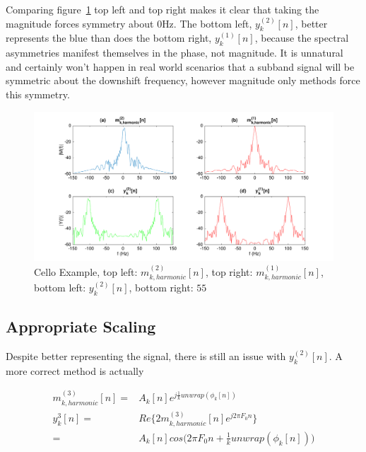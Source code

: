 \documentclass [11pt, proquest,oneside] {ganter_thesis}[2015/03/03]
\begin{document}
Comparing figure~\ref{fig:real_vs_magnitude_example} top left and top right makes it clear that taking the magnitude forces symmetry about $0$Hz.  The bottom left, $y_k^{(2)}[n]$, better represents the blue than does the bottom right, $y_k^{(1)}[n]$, because the spectral asymmetries manifest themselves in the phase, not magnitude.  It is unnatural and certainly won't happen in real world scenarios that a subband signal will be symmetric about the downshift frequency, however magnitude only methods force this symmetry.

\begin{figure}[!ht]
  \centering
    \includegraphics[width=1\textwidth]{matlab/real_vs_magnitude_example}   
    \caption{Cello Example, top left: $m^{(2)}_{k,harmonic}[n]$, top right: $m^{(1)}_{k,harmonic}[n]$, bottom left: $y^{(2)}_k[n]$, bottom right: $55$}\label{fig:real_vs_magnitude_example}
\end{figure}


\subsection{Appropriate Scaling}

Despite better representing the signal, there is still an issue with $y_k^{(2)}[n]$.  A more correct method is actually

\begin{align}
\label{eq:realVSmag3}
m^{(3)}_{k,harmonic}[n] =& A_k[n]e^{j\frac{1}{k} unwrap(\phi_k[n])} \\
y_k^3[n] =& Re\{ 2 m^{(3)}_{k,harmonic}[n] e^{j2\pi F_0 n} \}  \\
=& A_k[n]cos\Big(2\pi F_0 n + \frac{1}{k}unwrap(\phi_k[n])\Big) \nonumber
\end{align}
\end{document}
